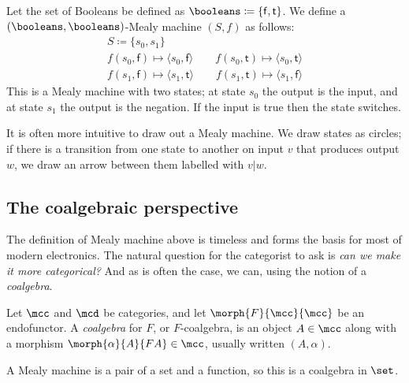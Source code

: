 \begin{example}\label{ex:mealy}
    Let the set of Booleans be defined as
    \(\booleans \coloneqq \{\mathsf{f},\mathsf{t}\}\).
    We define a \((\booleans,\booleans)\)-Mealy machine \((S, f)\) as follows:
    \begin{gather*}
        S \coloneqq \{s_0, s_1\}
        \\
        f(s_0, \mathsf{f}) \mapsto \langle{s_0, \mathsf{f}}\rangle
        \qquad
        f(s_0, \mathsf{t}) \mapsto \langle{s_0, \mathsf{t}}\rangle
        \\
        f(s_1, \mathsf{f}) \mapsto \langle{s_1, \mathsf{t}}\rangle
        \qquad
        f(s_1, \mathsf{t}) \mapsto \langle{s_1, \mathsf{f}}\rangle
    \end{gather*}
    This is a Mealy machine with two states; at state \(s_0\) the output is the
    input, and at state \(s_1\) the output is the negation.
    If the input is true then the state switches.

    It is often more intuitive to draw out a Mealy machine.
    We draw states as circles; if there is a transition from one state to
    another on input \(v\) that produces output \(w\), we draw an arrow between
    them labelled with \(v|w\).
    \begin{center}
        
    \end{center}
\end{example}

\subsection{The coalgebraic perspective}

The definition of Mealy machine above is timeless and forms the basis for most
of modern electronics.
The natural question for the categorist to ask is
\emph{can we make it more categorical?}
And as is often the case, we can, using the notion of a \emph{coalgebra}.

\begin{definition}[Coalgebra]
    Let \(\mcc\) and \(\mcd\) be categories, and let \(\morph{F}{\mcc}{\mcc}\)
    be an endofunctor.
    A \emph{coalgebra} for \(F\), or \(F\)-coalgebra, is an object
    \(A \in \mcc\) along with a morphism \(\morph{\alpha}{A}{FA} \in \mcc\),
    usually written \((A,\alpha)\).
\end{definition}

A Mealy machine is a pair of a set
and a function, so this is a coalgebra in \(\set\).

